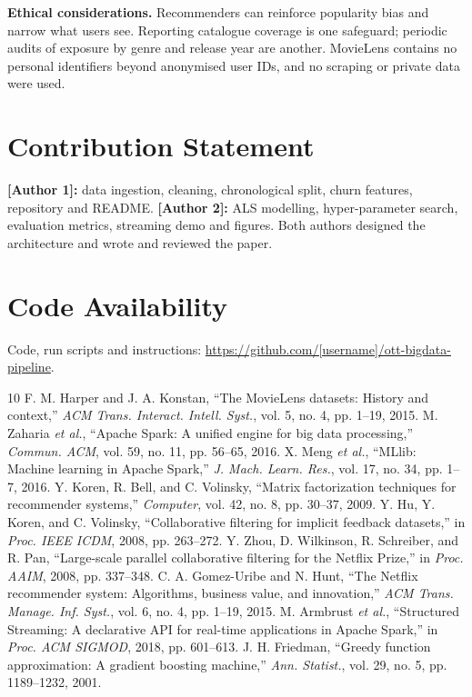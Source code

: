 \documentclass[conference]{IEEEtran}
\begin{document}
\textbf{Ethical considerations.} Recommenders can reinforce popularity bias and narrow what users see. Reporting catalogue coverage is one safeguard; periodic audits of exposure by genre and release year are another. MovieLens contains no personal identifiers beyond anonymised user IDs, and no scraping or private data were used.

\section*{Contribution Statement}
\textbf{[Author 1]:} data ingestion, cleaning, chronological split, churn features, repository and README. \textbf{[Author 2]:} ALS modelling, hyper-parameter search, evaluation metrics, streaming demo and figures. Both authors designed the architecture and wrote and reviewed the paper.

\section*{Code Availability}
Code, run scripts and instructions: \url{https://github.com/[username]/ott-bigdata-pipeline}.

\begin{thebibliography}{10}
 F. M. Harper and J. A. Konstan, ``The MovieLens datasets: History and context,'' \emph{ACM Trans. Interact. Intell. Syst.}, vol. 5, no. 4, pp. 1--19, 2015.
 M. Zaharia \emph{et al.}, ``Apache Spark: A unified engine for big data processing,'' \emph{Commun. ACM}, vol. 59, no. 11, pp. 56--65, 2016.
 X. Meng \emph{et al.}, ``MLlib: Machine learning in Apache Spark,'' \emph{J. Mach. Learn. Res.}, vol. 17, no. 34, pp. 1--7, 2016.
 Y. Koren, R. Bell, and C. Volinsky, ``Matrix factorization techniques for recommender systems,'' \emph{Computer}, vol. 42, no. 8, pp. 30--37, 2009.
 Y. Hu, Y. Koren, and C. Volinsky, ``Collaborative filtering for implicit feedback datasets,'' in \emph{Proc. IEEE ICDM}, 2008, pp. 263--272.
 Y. Zhou, D. Wilkinson, R. Schreiber, and R. Pan, ``Large-scale parallel collaborative filtering for the Netflix Prize,'' in \emph{Proc. AAIM}, 2008, pp. 337--348.
 C. A. Gomez-Uribe and N. Hunt, ``The Netflix recommender system: Algorithms, business value, and innovation,'' \emph{ACM Trans. Manage. Inf. Syst.}, vol. 6, no. 4, pp. 1--19, 2015.
 M. Armbrust \emph{et al.}, ``Structured Streaming: A declarative API for real-time applications in Apache Spark,'' in \emph{Proc. ACM SIGMOD}, 2018, pp. 601--613.
 J. H. Friedman, ``Greedy function approximation: A gradient boosting machine,'' \emph{Ann. Statist.}, vol. 29, no. 5, pp. 1189--1232, 2001.
\end{thebibliography}
\end{document}
